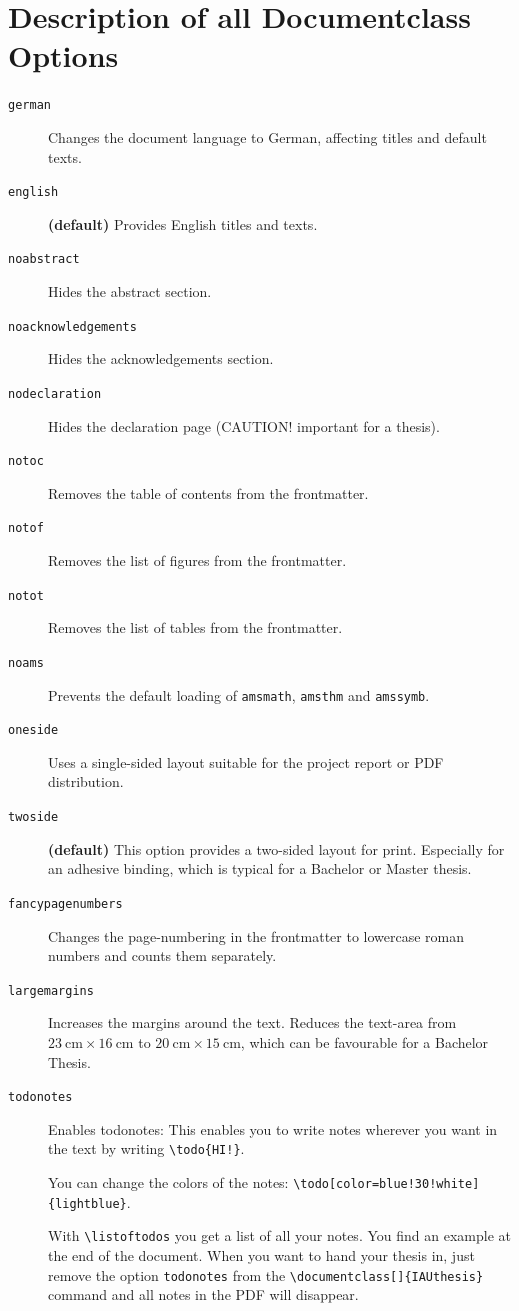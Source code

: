 \documentclass[12pt, todonotes, nodeclaration, oneside, fancypagenumbers, notof, notot, noabstract]{IAUthesis}
\newcommand{\code}[1]{\colorbox{black!10!white}{\texttt{#1}}}
\begin{document}
\section{Description of all Documentclass Options}\label{sec:dco}
\begin{description} 
\item[\code{german}] Changes the document language to German, affecting titles and default texts.
\item[\code{english}]{\textbf{(default)}} Provides English titles and texts.
\item[\code{noabstract}] Hides the abstract section.
\item[\code{noacknowledgements}] Hides the acknowledgements section.
\item[\code{nodeclaration}] Hides the declaration page (CAUTION! important for a thesis). 
\item[\code{notoc}] Removes the table of contents from the frontmatter.
\item[\code{notof}] Removes the list of figures from the frontmatter.
\item[\code{notot}] Removes the list of tables from the frontmatter.
\item[\code{noams}] Prevents the default loading of \texttt{amsmath}, \texttt{amsthm} and \texttt{amssymb}.
\item[\code{oneside}] Uses a single-sided layout suitable for the project report or PDF distribution.
\item[\code{twoside}]{\textbf{(default)}} This option provides a two-sided layout for print. Especially for an adhesive binding, which is typical for a Bachelor or Master thesis.
\item[\code{fancypagenumbers}] Changes the page-numbering in the frontmatter to lowercase roman numbers and counts them separately.
\item[\code{largemargins}] Increases the margins around the text. Reduces the text-area from $\SI{23}{\centi\meter}\times\SI{16}{\centi\meter}$ to $\SI{20}{\centi\meter}\times\SI{15}{\centi\meter}$, which can be favourable for a Bachelor Thesis.
\item[\code{todonotes}] Enables todonotes: This enables you to write notes wherever you want in the text by writing \texttt{\textbackslash{}todo\{HI!\}}. 

You can change the colors of the notes: \texttt{\textbackslash{}todo[color=blue!30!white]\{lightblue\}}.

With \texttt{\textbackslash{}listoftodos} you get a list of all your notes. You find an example at the end of the document. When you want to hand your thesis in, just remove the option \texttt{todonotes} from the \texttt{\textbackslash{}documentclass[]\{IAUthesis\}} command and all notes in the PDF will disappear.
\end{description}
\end{document}
